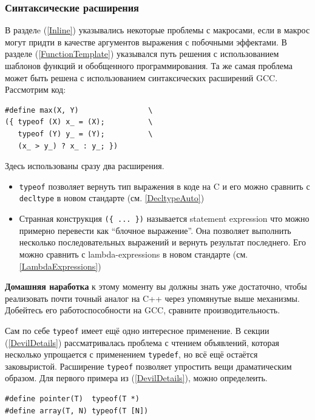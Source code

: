 \documentclass[a4paper,12pt,oneside]{article}
\begin{document}
\subsubsection{Синтаксические расширения}\label{SyntacticExts}

В разделe (\ref{Inline}) указывались некоторые проблемы с макросами, если в макрос могут придти в качестве аргументов выражения с побочными эффектами. В разделе (\ref{FunctionTemplate}) указывался путь решения с использованием шаблонов функций и обобщенного программирования. Та же самая проблема может быть решена с использованием синтаксических расширений GCC. Рассмотрим код:

\begin{lstlisting}
#define max(X, Y)                \
({ typeof (X) x_ = (X);          \
   typeof (Y) y_ = (Y);          \
   (x_ > y_) ? x_ : y_; })
\end{lstlisting}

Здесь использованы сразу два расширения. 

\begin{itemize}
\item \lstinline!typeof! позволяет вернуть тип выражения в коде на C и его можно сравнить с \lstinline!decltype! в новом стандарте (см. \ref{DecltypeAuto})
\item Странная конструкция \lstinline!({ ... })! называется statement expression что можно примерно перевести как ``блочное выражение''. Она позволяет выполнить несколько последовательных выражений и вернуть результат последнего. Его можно сравнить с lambda-expressions в новом стандарте (см. \ref{LambdaExpressions})
\end{itemize}

\textbf{Домашняя наработка} к этому моменту вы должны знать уже достаточно, чтобы реализовать почти точный аналог на C++ через упомянутые выше механизмы. Добейтесь его работоспособности на GCC, сравните производительность.

Сам по себе \lstinline!typeof! имеет ещё одно интересное применение. В секции (\ref{DevilDetails}) рассматривалась проблема с чтением объявлений, которая несколько упрощается с применением \lstinline!typedef!, но всё ещё остаётся заковыристой. Расширение \lstinline!typeof! позволяет упростить вещи драматическим образом. Для первого примера из (\ref{DevilDetails}), можно определеить.

\begin{lstlisting}
#define pointer(T)  typeof(T *)
#define array(T, N) typeof(T [N])
\end{lstlisting}
\end{document}
